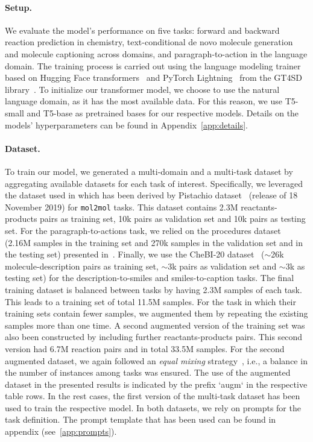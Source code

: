 \documentclass[nohyperref]{article}
\theoremstyle{plain}
\theoremstyle{definition}
\theoremstyle{remark}
\begin{document}
\paragraph{Setup.}
We evaluate the model's performance on five tasks: forward and backward reaction prediction in chemistry, text-conditional de novo molecule generation and molecule captioning across domains, and paragraph-to-action in the language domain.
The training process is carried out using the language modeling trainer based on Hugging Face transformers~\citep{Wolf_Transformers_State-of-the-Art_Natural_2020} and PyTorch Lightning~\citep{Falcon_PyTorch_Lightning_2019} from the GT4SD library~\citep{manica2022gt4sd}.
To initialize our transformer model, we choose to use the natural language domain, as it has the most available data. For this reason, we use T5-small and T5-base as pretrained bases for our respective models.
Details on the models' hyperparameters can be found in Appendix~\ref{app:details}.


\paragraph{Dataset.}
To train our model, we generated a multi-domain and a multi-task dataset by aggregating available datasets for each task of interest. Specifically, we leveraged the dataset used in \citet{toniato2021unassisted} which has been derived by Pistachio dataset~\citep{pistachio} (release of 18 November 2019) for \texttt{mol2mol} tasks. This dataset contains 2.3M reactants-products pairs as training set, 10k pairs as validation set and 10k pairs as testing set. For the paragraph-to-actions task, we relied on the procedures dataset (2.16M samples in the training set and 270k samples in the validation set and in the testing set) presented in~\citeauthor{vaucher2020automated}. Finally, we use the CheBI-20 dataset~\citep{edwards2021text2mol,edwards2022translation} ($\sim$26k molecule-description pairs as training set, $\sim$3k pairs as validation set and $\sim$3k as testing set) for the description-to-smiles and smiles-to-caption tasks. The final training dataset is balanced between tasks by having 2.3M samples of each task. This leads to a training set of total 11.5M samples. For the task in which their training sets contain fewer samples, we augmented them by repeating the existing samples more than one time. A second augmented version of the training set was also been constructed by including further reactants-products pairs. This second version had 6.7M reaction pairs and in total 33.5M samples. For the second augmented dataset, we again followed an \emph{equal mixing} strategy~\cite{raffel2020exploring}, i.e., a balance in the number of instances among tasks was ensured. The use of the augmented dataset in the presented results is indicated by the prefix `augm` in the respective table rows. In the rest cases, the first version of the multi-task dataset has been used to train the respective model. In both datasets, we rely on prompts for the task definition. The prompt template that has been used can be found in appendix (see~\autoref{app:prompts}).
\end{document}
